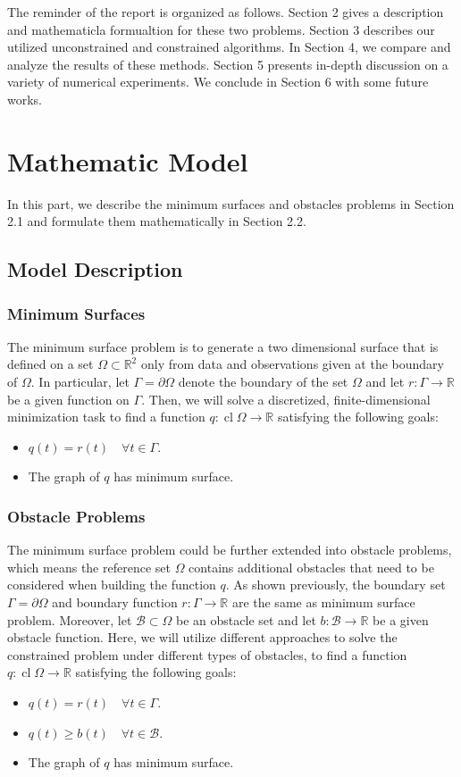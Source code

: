 \documentclass[11pt]{article}
\begin{document}
The reminder of the report is organized as follows. Section 2 gives a description and mathematicla formualtion for these two problems. Section 3 describes our utilized unconstrained and constrained algorithms. In Section 4, we compare and analyze the results of these methods. Section 5 presents in-depth discussion on a variety of numerical experiments. We conclude in Section 6 with some future works.

\section{Mathematic Model}
In this part, we describe the minimum surfaces and obstacles problems in Section 2.1 and formulate them mathematically in Section 2.2.
\subsection{Model Description}
\subsubsection{Minimum Surfaces}
The minimum surface problem is to generate a two dimensional surface that is defined on a set $\Omega \subset \mathbb{R}^{2}$ only from data and observations given at the boundary of $\Omega.$ In particular, let $\Gamma=\partial \Omega$ denote the boundary of the set $\Omega$ and let $r: \Gamma \rightarrow \mathbb{R}$ be a given function on $\Gamma .$ Then, we will solve a discretized, finite-dimensional minimization task to find a function $q: \operatorname{cl} \Omega \rightarrow \mathbb{R}$ satisfying the following goals:

\begin{itemize}
    \item $ q(t)=r(t) \quad \forall t \in \Gamma$.
    \item The graph of $q$ has minimum surface.
\end{itemize}
\subsubsection{Obstacle Problems}
The minimum surface problem could be further extended into obstacle problems, which means the reference set $\Omega$ contains additional obstacles that need to be considered when building the function $q$. As shown previously, the boundary set $\Gamma=\partial \Omega$ and boundary function $r: \Gamma \rightarrow \mathbb{R}$ are the same as minimum surface problem. Moreover, let $\mathcal{B} \subset \Omega$ be an obstacle set and let $b: \mathcal{B} \rightarrow \mathbb{R}$ be a given obstacle function. Here, we will utilize different approaches to solve the constrained problem under different types of obstacles, to find a function $q: \operatorname{cl} \Omega \rightarrow \mathbb{R}$ satisfying the following goals:
\begin{itemize}
  \item $ q(t)=r(t) \quad \forall t \in \Gamma$. 
  \item $ q(t) \geq b(t) \quad \forall t \in \mathcal{B} $.
  \item The graph of $q$ has minimum surface.
\end{itemize}
\end{document}
